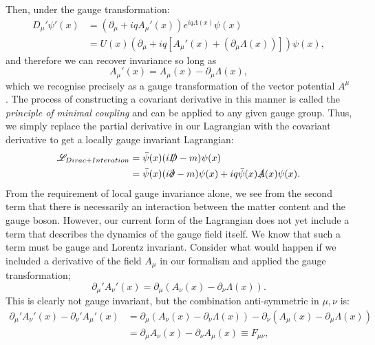 Then, under the gauge transformation:
\begin{equation}
\begin{split}
D_\mu' \psi'(x) & = (\partial_\mu + i q A_\mu'(x)) e^{i q \Lambda(x)} \psi(x) \\
& = U(x)(\partial_\mu + iq[A_\mu'(x) + (\partial_\mu \Lambda(x))])\psi(x),
\end{split}
\end{equation}
and therefore we can recover invariance so long as
\begin{equation}
A_\mu'(x) = A_\mu(x) - \partial_\mu \Lambda(x),
\end{equation}
which we recognise precisely as a gauge transformation of the vector potential $A^\mu$. The process of constructing a covariant derivative in this manner is called the \emph{principle of minimal coupling} and can be applied to any given gauge group. Thus, we simply replace the partial derivative in our Lagrangian with the covariant derivative to get a locally gauge invariant Lagrangian:
\begin{equation}
\begin{split}
\mathscr{L}_{Dirac+Interation} &= \bar{\psi}(x)(i \slashed{D} - m)\psi(x) \\
& = \bar{\psi}(x)(i \slashed{\partial} -m) \psi(x) + i q \bar{\psi}(x) \slashed{A}(x) \psi(x).
\end{split}
\end{equation}
From the requirement of local gauge invariance alone, we see from the second term that there is necessarily an interaction between the matter content and the gauge boson. However, our current form of the Lagrangian does not yet include a term that describes the dynamics of the gauge field itself. We know that such a term must be gauge and Lorentz invariant. Consider what would happen if we included a derivative of the field $A_\mu$ in our formalism and applied the gauge transformation;
\begin{equation}
\partial_\mu ' A_\nu'  (x) = \partial_\mu (A_\nu(x) - \partial_\nu \Lambda(x)).
\end{equation}
This is clearly not gauge invariant, but the combination anti-symmetric in $\mu,\nu$ is:
\begin{equation}
\begin{split}
\partial_\mu ' A_\nu' (x) - \partial_\nu' A_\mu'(x) & = \partial_\mu (A_\nu(x) - \partial_\nu \Lambda(x)) -  \partial_\nu (A_\mu(x) - \partial_\mu \Lambda(x)) \\
&= \partial_\mu A_\nu (x) - \partial_\nu A_\mu(x) \equiv F_{\mu \nu}, 
\end{split}
\end{equation}
